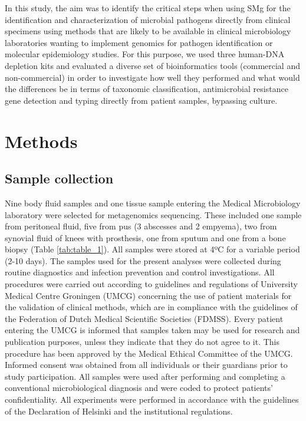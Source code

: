 In this study, the aim was to identify the critical steps when using \ac{SMg} for the identification and characterization of microbial pathogens directly from clinical specimens using methods that are likely to be available in clinical microbiology laboratories wanting to implement genomics for pathogen identification or molecular epidemiology studies. 
For this purpose, we used three human-DNA depletion kits and evaluated a diverse set of bioinformatics tools (commercial and non-commercial) in order to investigate how well they performed and what would the differences be in terms of taxonomic classification, antimicrobial resistance gene detection and typing directly from patient samples, bypassing culture. 

\section{Methods} \label{sec:methods}

\subsection{Sample collection} \label{ssec:sample_collection}

Nine body fluid samples and one tissue sample entering the Medical Microbiology laboratory were selected for metagenomics sequencing. 
These included one sample from peritoneal fluid, five from pus (3 abscesses and 2 empyema), two from synovial fluid of knees with prosthesis, one from sputum and one from a bone biopsy (Table \ref{tab:table_1}). 
All samples were stored at 4ºC for a variable period (2-10 days). 
The samples used for the present analyses were collected during routine diagnostics and infection prevention and control investigations. 
All procedures were carried out according to guidelines and regulations of University Medical Centre Groningen (UMCG) concerning the use of patient materials for the validation of clinical methods, which are in compliance with the guidelines of the Federation of Dutch Medical Scientific Societies (FDMSS).
Every patient entering the UMCG is informed that samples taken may be used for research and publication purposes, unless they indicate that they do not agree to it. 
This procedure has been approved by the Medical Ethical Committee of the UMCG. 
Informed consent was obtained from all individuals or their guardians prior to study participation. 
All samples were used after performing and completing a conventional microbiological diagnosis and were coded to protect patients’ confidentiality. 
All experiments were performed in accordance with the guidelines of the Declaration of Helsinki and the institutional regulations. 

